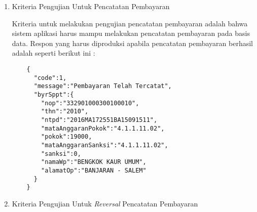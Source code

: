 \documentclass[pdftex,12pt, oneside]{article}
\begin{document}
\begin{enumerate}[1.]
  \begin{lstlisting}
    {
      "code":10,
      "message":"Data Tidak Ditemukan",
      "sppt":null
    }
  \end{lstlisting}
 
  Yang tidak kalah penting dalam sebuah pengujian adalah sistem aplikasi harus mampu menjelaskan atau menyajikan informasi apabila ada kondisi diluar skenario muncul, seperti, terputusnya koneksi antara \textit{server} aplikasi dengan \textit{server} basis data, atau kondisi \textit{server} basis data yang tidak memungkinkan menambah jalur komunikasi dari luar, atau kondisi-kondisi lain yang sejenis. Pesan yang harus dihasilkan dari sistem aplikasi jika kondisinya seperti demikian adalah seperti kode berikut ini :
  
  \begin{lstlisting}
    {
      "code":04,
      "message":"Kesalahan DB",
      "sppt":null
    }
  \end{lstlisting}
  
  \item Kriteria Pengujian Untuk Pencatatan Pembayaran
  
  Kriteria untuk melakukan pengujian pencatatan pembayaran adalah bahwa sistem aplikasi harus mampu melakukan pencatatan pembayaran pada basis data. Respon yang harus diproduksi apabila pencatatan pembayaran berhasil adalah seperti berikut ini :
  
  \begin{lstlisting}
    {
      "code":1,
      "message":"Pembayaran Telah Tercatat",
      "byrSppt":{
        "nop":"332901000300100010",
        "thn":"2010",
        "ntpd":"2016MA172551BA15091511",
        "mataAnggaranPokok":"4.1.1.11.02",
        "pokok":19000,
        "mataAnggaranSanksi":"4.1.1.11.02",
        "sanksi":0,
        "namaWp":"BENGKOK KAUR UMUM",
        "alamatOp":"BANJARAN - SALEM"
      }
    }
  \end{lstlisting}
  
  \item Kriteria Pengujian Untuk \textit{Reversal} Pencatatan Pembayaran
\end{enumerate}
\end{document}
